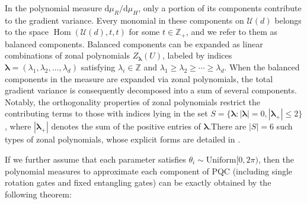\documentclass[%
 reprint,
 superscriptaddress,
 amsmath,amssymb,
 aps, prl, twocolumn, showpacs,
]{revtex4-2}
\newtheorem{theorem}{Theorem}
\begin{document}
In the polynomial measure $\mathrm{d}\mu_R / \mathrm{d}\mu_H$, only a portion of its components contribute to the gradient variance. Every monomial in these components on $\mathcal{U}(d)$ belongs to the space $\operatorname{Hom}(\mathcal{U}(d), t, t)$ for some $t \in \mathbb{Z}_+$, and we refer to them as balanced components. Balanced components can be expanded as linear combinations of zonal polynomials $Z_{\boldsymbol\lambda}(U)$, labeled by indices ${\boldsymbol\lambda} = ({\lambda}_1, {\lambda}_2, \ldots, {\lambda}_d)$ satisfying ${\lambda}_i \in \mathbb{Z}$ and ${\lambda}_1 \geq {\lambda}_2 \geq \cdots \geq {\lambda}_d$. When the balanced components in the measure are expanded via zonal polynomials, the total gradient variance is consequently decomposed into a sum of several components. Notably, the orthogonality properties of zonal polynomials restrict the contributing terms to those with indices lying in the set $S = \{{\boldsymbol\lambda}: |{\boldsymbol\lambda}| = 0, |{\boldsymbol\lambda}_+| \leq 2\}$, where $|{\boldsymbol\lambda}_+|$ denotes the sum of the positive entries of ${\boldsymbol\lambda}$.There are $|S| = 6$ such types of zonal polynomials, whose explicit forms are detailed in \cite{roy2009unitary}.

If we further assume that each parameter satisfies $\theta_i\sim \mathrm{Uniform}[0, 2\pi)$, then the polynomial measures to approximate each component of PQC (including single rotation gates and fixed entangling gates) can be exactly obtained by the following theorem:
    
\end{document}
